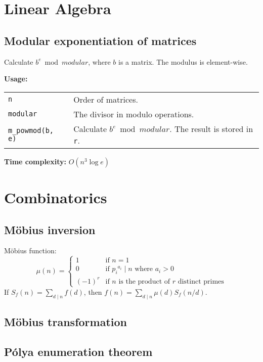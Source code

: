 \section{Linear Algebra}
\subsection{Modular exponentiation of matrices}
Calculate $b^e \bmod modular$, where $b$ is a matrix. The modulus is element-wise.\par
\textbf{Usage:} \\[0.1cm]
\begin{tabular}{p{3cm} p{8.5cm}}
  \lstinline|n| & Order of matrices. \\
  \lstinline|modular| & The divisor in modulo operations. \\
  \lstinline|m_powmod(b, e)| & Calculate $b^e \bmod modular$. The result is stored in \lstinline|r|. \\
\end{tabular} \par
\textbf{Time complexity:} $O(n^3 \log e)$ \par


\section{Combinatorics}
\subsection{M\"{o}bius inversion}
M\"{o}bius function:
$$ \mu(n) = \begin{cases} 1 & \text{if } n=1  \\ 0 & \text{if } {p_i}^{a_i} \mid n \text{ where } a_i > 0 \\ (-1)^r & \text{if } n \text{ is the product of } r \text{ distinct primes} \end{cases} $$
If $S_f(n) = \sum_{d \mid n} f(d)$, then $f(n) = \sum_{d \mid n} \mu(d) S_f(n/d)$.

\subsection{M\"{o}bius transformation}

\subsection{P\'olya enumeration theorem}

